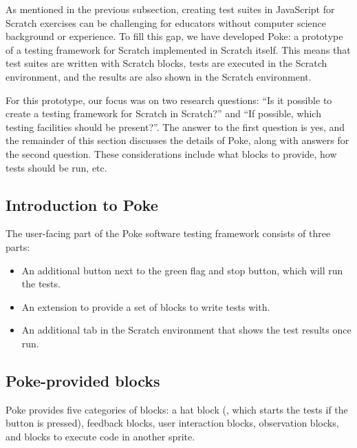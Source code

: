 \documentclass[../main]{subfiles}
\begin{document}
As mentioned in the previous subsection, creating test suites in JavaScript for Scratch exercises can be challenging for educators without computer science background or experience.
To fill this gap, we have developed Poke: a prototype of a testing framework for Scratch implemented in Scratch itself.
This means that test suites are written with Scratch blocks, tests are executed in the Scratch environment, and the results are also shown in the Scratch environment.

For this prototype, our focus was on two research questions: ``Is it possible to create a testing framework for Scratch in Scratch?'' and ``If possible, which testing facilities should be present?''.
The answer to the first question is yes, and the remainder of this section discusses the details of Poke, along with answers for the second question.
These considerations include what blocks to provide, how tests should be run, etc.

\subsection{Introduction to Poke}\label{subsec:introduction-to-poke}

The user-facing part of the Poke software testing framework consists of three parts:

\begin{itemize}
    \item An additional button next to the green flag and stop button, which will run the tests.
    \item An extension to provide a set of blocks to write tests with.
    \item An additional tab in the Scratch environment that shows the test results once run.
\end{itemize}


\subsection{Poke-provided blocks}\label{subsec:poke-provided-blocks}

Poke provides five categories of blocks: a hat block (, which starts the tests if the button is pressed), feedback blocks, user interaction blocks, observation blocks, and blocks to execute code in another sprite.
\end{document}
